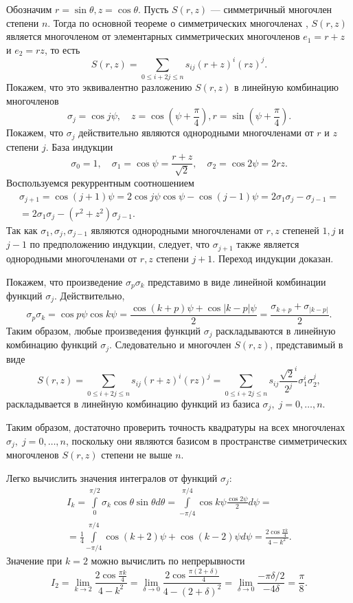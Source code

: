 Обозначим $r = \sin \theta, z = \cos \theta$. Пусть $S(r, z)$ --- симметричный многочлен степени $n$. Тогда по основной теореме о симметрических многочленах \cite{symm}, $S(r,z)$ является многочленом от элементарных симметрических многочленов $e_1 = r + z$ и $e_2 = r z$, то есть
\[
S(r, z) = \sum_{0 \leq i + 2j \leq n} s_{ij} (r + z)^i (r z)^{j}.
\]
Покажем, что это эквивалентно разложению $S(r, z)$ в линейную комбинацию многочленов
\[
\sigma_j = \cos j \psi, \quad z = \cos \left(\psi + \frac{\pi}{4}\right), r = \sin \left(\psi + \frac{\pi}{4}\right).
\]
Покажем, что $\sigma_j$ действительно являются однородными многочленами от $r$ и $z$ степени $j$. База индукции
\[
\sigma_0 = 1, \quad \sigma_1 = \cos \psi = \frac{r + z}{\sqrt{2}}, \quad \sigma_2 = \cos 2 \psi = 2 r z.
\]
Воспользуемся рекуррентным соотношением
\begin{multline*}
\sigma_{j+1} = \cos (j+1)\psi = 2\cos j\psi \cos \psi - \cos(j-1) \psi = 2 \sigma_1 \sigma_j - \sigma_{j-1} = \\ =
2 \sigma_1 \sigma_j - (r^2 + z^2) \sigma_{j-1}.
\end{multline*}
Так как $\sigma_1, \sigma_j, \sigma_{j-1}$ являются однородными многочленами от $r,z$ степеней $1, j$ и $j-1$ по предположению индукции, следует, что 
$\sigma_{j+1}$ также является однородными многочленами от $r,z$ степени $j + 1$. Переход индукции доказан.

Покажем, что произведение $\sigma_p \sigma_k$ представимо в виде линейной комбинации функций $\sigma_j$. Действительно,
\[
\sigma_p \sigma_k = \cos p \psi \cos k \psi = \frac{\cos (k + p) \psi + \cos |k - p|\psi}{2} = \frac{\sigma_{k+p} + \sigma_{|k-p|}}{2}.
\]
Таким образом, любые произведения функций $\sigma_j$ раскладываются в линейную комбинацию функций $\sigma_j$. Следовательно и многочлен $S(r, z)$, представимый в виде
\[
S(r, z) = \sum_{0 \leq i + 2j \leq n} s_{ij} (r + z)^i (r z)^{j} =  \sum_{0 \leq i + 2j \leq n} s_{ij} \frac{\sqrt{2}^i}{2^j} \sigma_1^i \sigma_2^{j},
\]
раскладывается в линейную комбинацию функций из базиса $\sigma_j, \; j = 0, \dots, n$.

Таким образом, достаточно проверить точность квадратуры на всех многочленах $\sigma_j, \; j = 0, \dots, n$, поскольку они являются базисом в пространстве симметрических многочленов $S(r, z)$ степени не выше $n$.

Легко вычислить значения интегралов от функций $\sigma_j$:
\begin{multline*}
I_k = \int\limits_0^{\pi/2} \sigma_k \cos \theta \sin \theta d\theta = 
\int\limits_{-\pi/4}^{\pi/4} \cos k \psi \frac{\cos 2 \psi}{2} d\psi = \\
= \frac{1}{4} \int\limits_{-\pi/4}^{\pi/4} \cos (k+2) \psi + \cos (k-2) \psi d\psi =
\frac{2\cos \frac{\pi k}{4}}{4 - k^2}.
\end{multline*}
Значение при $k = 2$ можно вычислить по непрерывности
\[
I_2 = \lim_{k \to 2} \frac{2\cos \frac{\pi k}{4}}{4 - k^2} = 
\lim_{\delta \to 0} \frac{2\cos \frac{\pi (2 + \delta)}{4}}{4 - (2 + \delta)^2} = 
\lim_{\delta \to 0} \frac{-\pi\delta/2}{-4\delta} = \frac{\pi}{8}.
\]


